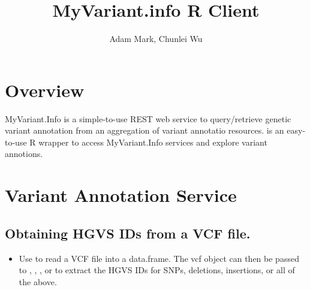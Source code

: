 \documentclass[12pt]{article}
\title{MyVariant.info R Client}
\author{Adam Mark, Chunlei Wu}
\begin{document}


\maketitle

\tableofcontents

\section{Overview}

MyVariant.Info is a simple-to-use REST web service to query/retrieve genetic variant annotation from an aggregation of variant annotatio resources.  is an easy-to-use R wrapper to access MyVariant.Info services and explore variant annotions.
\section{Variant Annotation Service}

\subsection{Obtaining HGVS IDs from a VCF file. }

\begin{itemize}
\item Use  to read a VCF file into a data.frame. The vcf object can then be passed to , , , or  to extract the HGVS IDs for SNPs, deletions, insertions, or all of the above. 
\end{itemize} 
\end{document}
